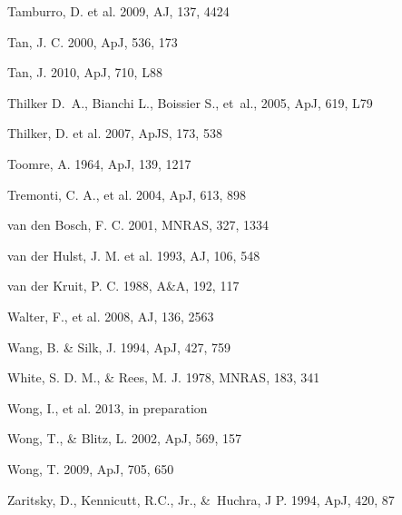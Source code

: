 \documentclass[12pt,preprint]{aastex}
\begin{document}
\begin{thebibliography}{}
 Tamburro, D. et al. 2009, AJ, 137, 4424

 Tan, J. C. 2000, ApJ, 536, 173

 Tan, J. 2010, ApJ, 710, L88

         Thilker D.~A.,  Bianchi L.,  Boissier S.,    et~al., 2005, ApJ, 619, L79

 Thilker, D. et al. 2007, ApJS, 173, 538

 Toomre, A. 1964, ApJ, 139, 1217

 Tremonti, C. A., et al. 2004, ApJ, 613, 898

 van den Bosch, F. C. 2001, MNRAS, 327, 1334

 van der Hulst, J. M. et al. 1993, AJ, 106, 548

 van der Kruit, P. C. 1988, A\&A, 192, 117


Walter, F., et al. 2008, AJ, 136, 2563

Wang, B. \& Silk, J. 1994, ApJ, 427, 759

 White, S. D. M., \& Rees, M. J. 1978, MNRAS, 183, 341


Wong, I., et al. 2013, in preparation 

 Wong, T., \& Blitz, L. 2002, ApJ, 569, 157

 Wong, T. 2009, ApJ, 705, 650

          Zaritsky, D., Kennicutt, R.C., Jr., \&\ Huchra, J P. 1994, ApJ, 420, 87



\end{thebibliography}
\end{document}
